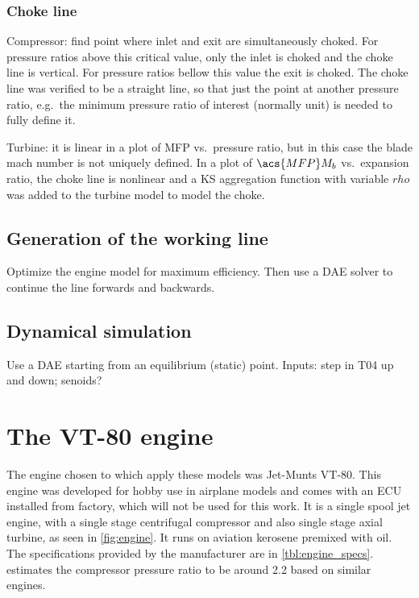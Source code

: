 \documentclass[tcc]{subfiles}
\begin{document}
\subsubsection*{Choke line}
Compressor: find point where inlet and exit are simultaneously choked. For pressure ratios above this critical value, only the inlet is choked and the choke line is vertical. For pressure ratios bellow this value the exit is choked. The choke line was verified to be a straight line, so that just the point at another pressure ratio, e.g.\ the minimum pressure ratio of interest (normally unit) is needed to fully define it.

Turbine: it is linear in a plot of \acs{MFP} vs.\ pressure ratio, but in this case the blade mach number is not uniquely defined. In a plot of $\acs{MFP}M_b$ vs.\ expansion ratio, the choke line is nonlinear and a KS aggregation function with variable $rho$ was added to the turbine model to model the choke.

\subsection{Generation of the working line}
Optimize the engine model for maximum efficiency.
Then use a \ac{DAE} solver to continue the line forwards and backwards.

\subsection{Dynamical simulation}
Use a \ac{DAE} starting from an equilibrium (static) point.
Inputs: step in T04 up and down; senoids?

\section{The VT-80 engine}
The engine chosen to which apply these models was Jet-Munts VT-80.
This engine was developed for hobby use in airplane models and comes with an \gls{ECU} installed from factory, which will not be used for this work.
It is a single spool jet engine, with a single stage centrifugal compressor 
 and also single stage axial turbine, as seen in \cref{fig:engine}. 
It runs on aviation kerosene premixed with oil.%
The specifications provided by the manufacturer are in \cref{tbl:engine_specs}.
\textcite{bolsoni} estimates the compressor pressure ratio 
to be around 2.2 based on similar engines.
\end{document}

